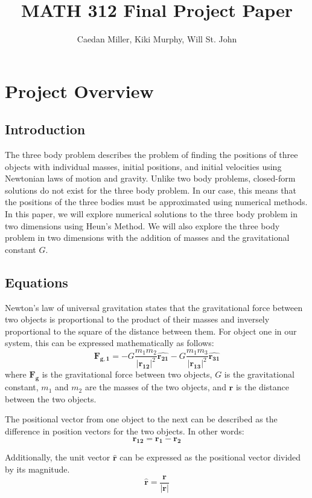 \documentclass{article}
\author{Caedan Miller, Kiki Murphy, Will St. John}
\title{MATH 312 Final Project Paper}
\begin{document}
\maketitle
\tableofcontents
\newpage
\section{Project Overview}
\subsection{Introduction}
The three body problem describes the problem of finding the positions of three objects with individual masses, initial positions, and initial velocities using Newtonian laws of motion and gravity. Unlike two body problems, closed-form solutions do not exist for the three body problem. In our case, this means that the positions of the three bodies must be approximated using numerical methods. In this paper, we will explore numerical solutions to the three body problem in two dimensions using Heun's Method. We will also explore the three body problem in two dimensions with the addition of masses and the gravitational constant $G$.


\subsection{Equations}
Newton's law of universal gravitation states that the gravitational force between two objects is proportional to the product of their masses and inversely proportional to the square of the distance between them. For object one in our system, this can be expressed mathematically as follows:
\begin{equation}
    \bm{F_{g,1}} = -G\frac{m_1 m_2}{|\bm{r_{12}}|^2}\bm{\hat{r_{21}}} -G\frac{m_1 m_3}{|\bm{r_{13}}|^2}\bm{\hat{r_{31}}}
\end{equation}
where $\bm{F_g}$ is the gravitational force between two objects, $G$ is the gravitational constant, $m_1$ and $m_2$ are the masses of the two objects, and $\bm{r}$ is the distance between the two objects.

The positional vector from one object to the next can be described as the difference in position vectors for the two objects. In other words:
\begin{equation}
    \bm{r_{12}} = \bm{r_1} - \bm{r_2}
\end{equation}

Additionally, the unit vector $\bm{\hat{r}}$ can be expressed as the positional vector divided by its magnitude.
\begin{equation}
    \bm{\hat{r}} = \frac{\bm{r}}{|\bm{r}|}
\end{equation}
\end{document}
